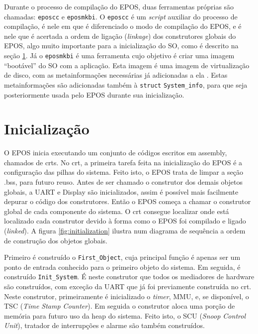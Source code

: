 
Durante o processo de compilação do EPOS, duas ferramentas próprias são chamadas: \verb=eposcc= e \verb=eposmkbi=. O \verb=eposcc= é um \emph{script} auxiliar do processo de compilação, é nele em que é diferenciado o modo de compilação do EPOS, e é nele que é acertada a ordem de ligação (\emph{linkage}) dos construtores globais do EPOS, algo muito importante para a inicialização do SO, como é descrito na seção \ref{sec:inicializacao}.
Já o \verb=eposmkbi= é uma ferramenta cujo objetivo é criar uma imagem ``bootável'' do SO com a aplicação. Esta imagem é uma imagem de virtualização de disco, com as metainformações necessárias já adicionadas a ela \cite{tarcisio}. Estas metainformações são adicionadas também à \verb=struct= \verb+System_info+, para que seja posteriormente usada pelo EPOS durante sua inicialização.



\section{Inicialização}
\label{sec:inicializacao}
O EPOS inicia executando um conjunto de códigos escritos em assembly, chamados de crts.
No crt, a primeira tarefa feita na inicialização do EPOS é a configuração das pilhas do sistema. Feito isto, o EPOS trata de limpar a seção .bss, para futuro reuso.
Antes de ser chamado o construtor dos demais objetos globais, a UART e Display são inicializados, assim é possível mais facilmente depurar o código dos construtores.
Então o EPOS começa a chamar o construtor global de cada componente do sistema. O crt consegue localizar onde está localizado cada construtor devido à forma como o EPOS foi compilado e ligado (\emph{linked}). A figura \ref{fig:initialization} ilustra num diagrama de sequência a ordem de construção dos objetos globais.


Primeiro é construído o \verb+First_Object+, cuja principal função é apenas ser um ponto de entrada conhecido para o primeiro objeto do sistema.
Em seguida, é construído \verb+Init_System+. É neste construtor que todos os mediadores de hardware são construídos, com exceção da UART que já foi previamente construída no crt. Neste construtor, primeiramente é inicializado o \emph{timer}, MMU, e, se disponível, o TSC (\emph{Time Stamp Counter}). Em seguida o construtor aloca uma porção de memória para futuro uso da heap do sistema. Feito isto, o SCU (\emph{Snoop Control Unit}), tratador de interrupções e alarme são também construídos.


